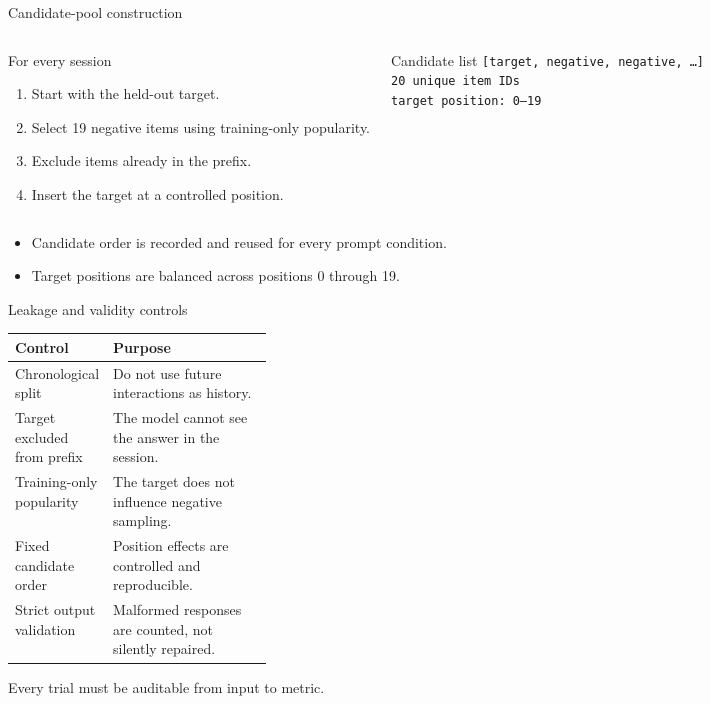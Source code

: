 \documentclass[aspectratio=169,12pt]{beamer}
\newcommand{\code}[1]{\texttt{\footnotesize #1}}
\begin{document}
\begin{frame}{Candidate-pool construction}
\begin{columns}[T]
\begin{block}{For every session}
\begin{enumerate}
  \item Start with the held-out target.
  \item Select 19 negative items using training-only popularity.
  \item Exclude items already in the prefix.
  \item Insert the target at a controlled position.
\end{enumerate}
\end{block}

\begin{exampleblock}{Candidate list}
\centering
\code{[target, negative, negative, \ldots]}\\[0.5em]
\code{20 unique item IDs}\\[0.5em]
\code{target position: 0--19}
\end{exampleblock}
\end{columns}

\vspace{0.5em}
\begin{itemize}
  \item Candidate order is recorded and reused for every prompt condition.
  \item Target positions are balanced across positions 0 through 19.
\end{itemize}
\end{frame}

\begin{frame}{Leakage and validity controls}
\begin{tabularx}{\linewidth}{@{}p{0.30\linewidth}X@{}}
\toprule
\textbf{Control} & \textbf{Purpose}\\
\midrule
Chronological split &
Do not use future interactions as history.\\
Target excluded from prefix &
The model cannot see the answer in the session.\\
Training-only popularity &
The target does not influence negative sampling.\\
Fixed candidate order &
Position effects are controlled and reproducible.\\
Strict output validation &
Malformed responses are counted, not silently repaired.\\
\bottomrule
\end{tabularx}

\vspace{0.6em}
\centering
\Large\textcolor{DeepBlue}{Every trial must be auditable from input to metric.}
\end{frame}
\end{document}
